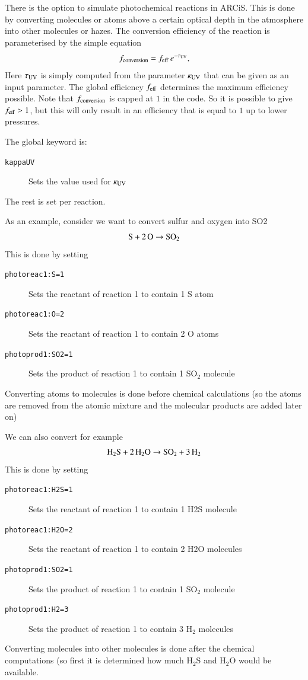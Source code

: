 \documentclass[12pt]{article}
\begin{document}
There is the option to simulate photochemical reactions in ARCiS. This is done by converting molecules or atoms above a certain optical depth in the atmosphere into other molecules or hazes.
The conversion efficiency of the reaction is parameterised by the simple equation
\begin{equation}
f_{\rm conversion} = f_{\rm eff}\,e^{-\tau_{\rm UV}},
\end{equation}
Here $\tau_{\rm UV}$ is simply computed from the parameter $\kappa_{\rm UV}$ that can be given as an input parameter. The global efficiency $f_{\rm eff}$ determines the maximum efficiency possible. Note that $f_{\rm conversion}$ is capped at $1$ in the code. So it is possible to give $f_{\rm eff}>1$, but this will only result in an efficiency that is equal to $1$ up to lower pressures.

The global keyword is:
\begin{description}
\item[\texttt{kappaUV}]
Sets the value used for $\kappa_{\rm UV}$
\end{description}

The rest is set per reaction. 

As an example, consider we want to convert sulfur and oxygen into SO2
\begin{equation}
\rm S+2\,O \rightarrow SO_2
\end{equation}
This is done by setting
\begin{description}
\item[\texttt{photoreac1:S=1}]
Sets the reactant of reaction 1 to contain 1 S atom
\item[\texttt{photoreac1:O=2}]
Sets the reactant of reaction 1 to contain 2 O atoms
\item[\texttt{photoprod1:SO2=1}]
Sets the product of reaction 1 to contain 1 SO$_2$ molecule
\end{description}
Converting atoms to molecules is done before chemical calculations (so the atoms are removed from the atomic mixture and the molecular products are added later on)

We can also convert for example
\begin{equation}
\rm H_2S+2\,H_2O \rightarrow SO_2 +3\,H_2
\end{equation}
This is done by setting
\begin{description}
\item[\texttt{photoreac1:H2S=1}]
Sets the reactant of reaction 1 to contain 1 H2S molecule
\item[\texttt{photoreac1:H2O=2}]
Sets the reactant of reaction 1 to contain 2 H2O molecules
\item[\texttt{photoprod1:SO2=1}]
Sets the product of reaction 1 to contain 1 SO$_2$ molecule
\item[\texttt{photoprod1:H2=3}]
Sets the product of reaction 1 to contain 3 H$_2$ molecules
\end{description}
Converting molecules into other molecules is done after the chemical computations (so first it is determined how much H$_2$S and H$_2$O would be available.
\end{document}

